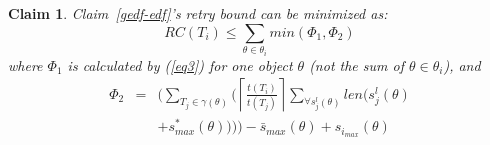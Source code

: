\documentclass{sig-alternate}
\newtheorem{clm}{Claim}
\begin{document}
\begin{clm}
Claim~\ref{gedf-edf}'s retry bound can be minimized as:
\begin{equation}
RC(T_{i})\le \sum_{\theta\in\theta_{i}}min(\Phi_1 , \Phi_2)\label{eq5}\end{equation}
where $\Phi_1$ is calculated by (\ref{eq3}) for one object $\theta$ (not the sum of $\theta \in \theta_i$),  and 
\begin{eqnarray}
\Phi_2 & = & \Big(\sum_{T_{j}\in\gamma(\theta)} \Big(\left\lceil\frac{t\left(T_{i}\right)}{t\left(T_{j}\right)}\right\rceil\sum_{\forall s_{j}^{l}(\theta)}len \big(s_{j}^{l}(\theta)\nonumber \\
 &  & +s_{max}^{*}(\theta) \big) \Big) \Big)-\bar{s}_{max}(\theta)+s_{i_{max}}(\theta)\label{eq4}\end{eqnarray}
\end{clm}
\end{document}
